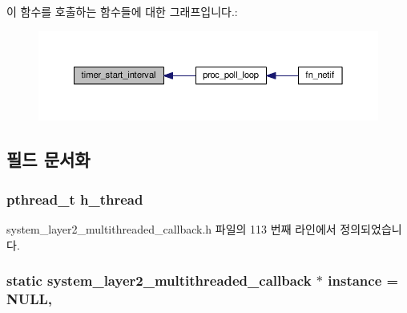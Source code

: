 이 함수를 호출하는 함수들에 대한 그래프입니다.\+:
\nopagebreak
\begin{figure}[H]
\begin{center}
\leavevmode
\includegraphics[width=350pt]{classavdecc__lib_1_1system__layer2__multithreaded__callback_ae921ed6f4870489118b852f37e353a1e_icgraph}
\end{center}
\end{figure}




\subsection{필드 문서화}
\subsubsection[{\texorpdfstring{h\+\_\+thread}{h_thread}}]{\setlength{\rightskip}{0pt plus 5cm}pthread\+\_\+t h\+\_\+thread\hspace{0.3cm}{\ttfamily [private]}}\hypertarget{classavdecc__lib_1_1system__layer2__multithreaded__callback_a6e4816698fce9da1e93d69ecbcc78506}{}\label{classavdecc__lib_1_1system__layer2__multithreaded__callback_a6e4816698fce9da1e93d69ecbcc78506}


system\+\_\+layer2\+\_\+multithreaded\+\_\+callback.\+h 파일의 113 번째 라인에서 정의되었습니다.

\subsubsection[{\texorpdfstring{instance}{instance}}]{\setlength{\rightskip}{0pt plus 5cm}static {\bf system\+\_\+layer2\+\_\+multithreaded\+\_\+callback} $\ast$ instance = {\bf N\+U\+LL}\hspace{0.3cm}{\ttfamily [static]}, {\ttfamily [private]}}\hypertarget{classavdecc__lib_1_1system__layer2__multithreaded__callback_a085719c035aa7d479dea20f36118da82}{}\label{classavdecc__lib_1_1system__layer2__multithreaded__callback_a085719c035aa7d479dea20f36118da82}


